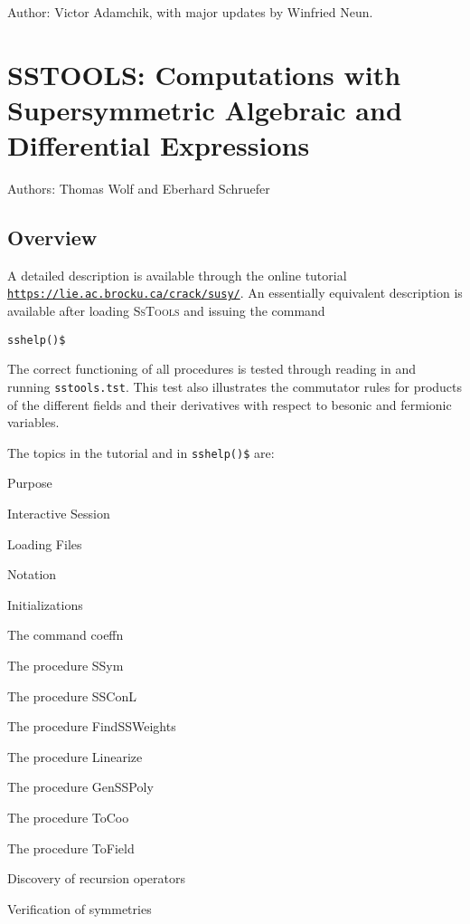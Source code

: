 Author: Victor Adamchik, with major updates by Winfried Neun.



\newpage

\section{SSTOOLS: Computations with Supersymmetric Algebraic and Differential
Expressions}


Authors: Thomas Wolf and Eberhard Schruefer


\subsection{Overview}
A detailed description is available through the online tutorial \\
\texttt{\url{https://lie.ac.brocku.ca/crack/susy/}}. An essentially equivalent
description is available after loading \textsc{SsTools} and issuing the command
\begin{verbatim}
sshelp()$
\end{verbatim}
The correct functioning of all procedures is tested through
reading in and running \texttt{sstools.tst}. This test also illustrates
the commutator rules for products of the different fields and their
derivatives with respect to besonic and fermionic variables.

The topics in the tutorial and in \texttt{sshelp()\$} are:
\begin{description}
\item{Purpose}
\item{Interactive Session}
\item{Loading Files}
\item{Notation}
\item{Initializations}
\item{The command coeffn}
\item{The procedure SSym}
\item{The procedure SSConL}
\item{The procedure FindSSWeights}
\item{The procedure Linearize}
\item{The procedure GenSSPoly}
\item{The procedure ToCoo}
\item{The procedure ToField}
\item{Discovery of recursion operators}
\item{Verification of symmetries}
\end{description}



